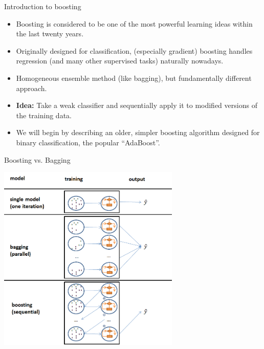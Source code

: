 











\begin{vbframe}{Introduction to boosting}
  \begin{itemize}
    \item
      Boosting is considered to be one of the most powerful learning ideas within the last twenty years.
    \item
      Originally designed for classification, (especially gradient) boosting handles regression (and many other supervised tasks) naturally nowadays.
    \item
      Homogeneous ensemble method (like bagging), but fundamentally different approach.
    \item
      {\bf Idea:} Take a weak classifier and sequentially apply it to modified versions of the training data.
    \item
      We will begin by describing an older, simpler boosting algorithm designed for binary classification, the popular \enquote{AdaBoost}.
  \end{itemize}
\end{vbframe}

\begin{vbframe}{Boosting vs. Bagging}

\begin{center}
\includegraphics[width=0.65\textwidth]{figure_man/bagging_vs_boosting.png}
\end{center}


\end{vbframe}

